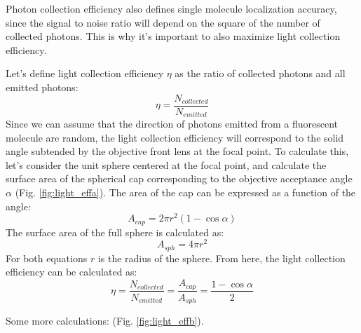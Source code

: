 \documentclass{diploma_style}
\begin{document}
    Photon collection efficiency also defines single molecule localization accuracy, since the signal to noise ratio will depend on the square of the number of collected photons. This is why it's important to also maximize light collection efficiency.
    
    Let's define light collection efficiency $\eta$ as the ratio of collected photons and all emitted photons:
    \[
    \eta = \frac{N_{collected}}{N_{emitted}}
    \]
    Since we can assume that the direction of photons emitted from a fluorescent molecule are random, the light collection efficiency will correspond to the solid angle subtended by the objective front lens at the focal point. To calculate this, let's consider the unit sphere centered at the focal point, and calculate the surface area of the spherical cap corresponding to the objective acceptance angle $\alpha$ (Fig. \ref{fig:light_effa}). The area of the cap can be expressed as a function of the angle:
    \[
    A_{cap} = 2\pi r^2 (1-\cos \alpha)
    \]
    The surface area of the full sphere is calculated as:
    \[
    A_{sph} = 4 \pi r^2
    \]
    For both equations $r$ is the radius of the sphere. From here, the light collection efficiency can be calculated as:
    \[
    \eta = \frac{N_{collected}}{N_{emitted}} = \frac{A_{cap}}{A_{sph}} = \frac{1-\cos \alpha}{2}
    \]

Some more calculations: (Fig. \ref{fig:light_effb}).
\end{document}
